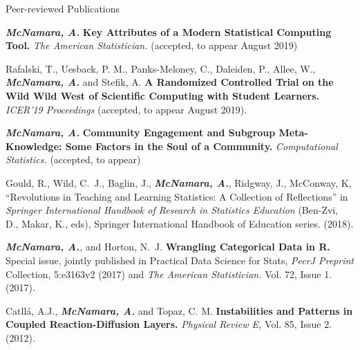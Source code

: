 \documentclass{resume} %
\begin{document}
\begin{rSection}{Peer-reviewed Publications}

{\bf \em{McNamara, A.}} {\bf Key Attributes of a Modern Statistical Computing Tool. } {\em The American Statistician.} (accepted, to appear August 2019) 

Rafalski, T., Uesback, P. M., Panks-Meloney, C., Daleiden, P., Allee, W., {\bf \em McNamara, A.} and Stefik, A. {\bf A Randomized Controlled Trial on the Wild Wild West of Scientific Computing with Student Learners.} {\em ICER'19 Proceedings} (accepted, to appear August 2019). 

{\bf \em McNamara, A.} {\bf Community Engagement and Subgroup Meta-Knowledge: Some Factors in the Soul of a Community.} { \em Computational Statistics.} (accepted, to appear)

Gould, R., Wild, C.~J., Baglin, J., {\bf \em McNamara, A.}, Ridgway, J., McConway, K, ``Revolutions in Teaching and Learning Statistics: A Collection of Reflections'' in {\em Springer International Handbook of Research in Statistics Education} (Ben-Zvi, D., Makar, K., eds), Springer International Handbook of Education series. (2018). 

{\bf \em{McNamara, A.}}, and Horton, N.~J. { \bf Wrangling Categorical Data in R. } 
\\Special issue, jointly published in Practical Data Science for Stats, {\em PeerJ Preprint} Collection, 5:e3163v2 (2017) and {\em The American Statistician.} Vol. 72, Issue 1. (2017). 

{Catll{\'a}, A.J., {\bf \em McNamara, A.} and Topaz, C. M. } {\bf Instabilities and Patterns in Coupled Reaction-Diffusion Layers.} {\em Physical Review E,} Vol. 85, Issue 2. (2012). 

\end{rSection}
\end{document}
